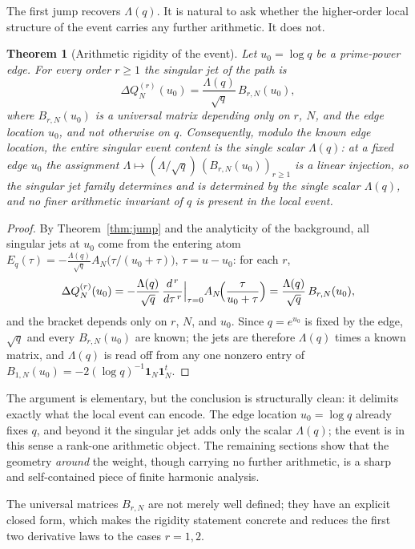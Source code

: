 \documentclass[11pt]{article}
\theoremstyle{plain}
\newtheorem{theorem}{Theorem}[section]
\theoremstyle{definition}
\theoremstyle{remark}
\newcommand{\one}{\mathbf 1}
\newcommand{\Lam}{\Lambda}
\begin{document}
The first jump recovers $\Lam(q)$. It is natural to ask whether the higher-order
local structure of the event carries any further arithmetic. It does not.

\begin{theorem}[Arithmetic rigidity of the event]\label{thm:rigidity}
Let $u_0=\log q$ be a prime-power edge. For every order $r\ge1$ the singular jet
of the path is
\[
        \Delta Q_N^{(r)}(u_0)=\frac{\Lam(q)}{\sqrt q}\,B_{r,N}(u_0),
\]
where $B_{r,N}(u_0)$ is a universal matrix depending only on $r$, $N$, and the
edge location $u_0$, and not otherwise on $q$. Consequently, modulo the known
edge location, the entire singular event content is the single scalar $\Lam(q)$:
at a fixed edge $u_0$ the assignment
$\Lam\mapsto(\Lam/\sqrt q)\,(B_{r,N}(u_0))_{r\ge1}$ is a linear injection, so
the singular jet family determines and is determined by the single scalar
$\Lam(q)$, and no
finer arithmetic invariant of $q$ is present in the local event.
\end{theorem}

\begin{proof}
By Theorem~\ref{thm:jump} and the analyticity of the background, all singular
jets at $u_0$ come from the entering atom
$E_q(\tau)=-\tfrac{\Lam(q)}{\sqrt q}A_N\!\bigl(\tau/(u_0+\tau)\bigr)$,
$\tau=u-u_0$: for each $r$,
\[
        \Delta Q_N^{(r)}(u_0)
        =-\frac{\Lam(q)}{\sqrt q}\,
        \frac{d^{\,r}}{d\tau^{\,r}}\Big|_{\tau=0}
        A_N\!\Bigl(\frac{\tau}{u_0+\tau}\Bigr)
        =\frac{\Lam(q)}{\sqrt q}\,B_{r,N}(u_0),
\]
and the bracket depends only on $r$, $N$, and $u_0$. Since $q=e^{u_0}$ is fixed
by the edge, $\sqrt q$ and every $B_{r,N}(u_0)$ are known; the jets are therefore
$\Lam(q)$ times a known matrix, and $\Lam(q)$ is read off from any one nonzero
entry of $B_{1,N}(u_0)=-2(\log q)^{-1}\one_N\one_N^t$.
\end{proof}

The argument is elementary, but the conclusion is structurally clean: it
delimits exactly what the local event can encode. The edge location $u_0=\log q$
already fixes $q$, and beyond it the singular jet adds only the scalar $\Lam(q)$;
the event is in this sense a rank-one arithmetic object. The remaining sections
show that the geometry \emph{around} the weight, though carrying no further
arithmetic, is a sharp and self-contained piece of finite harmonic analysis.

The universal matrices $B_{r,N}$ are not merely well defined; they have an
explicit closed form, which makes the rigidity statement concrete and reduces the
first two derivative laws to the cases $r=1,2$.
\end{document}
